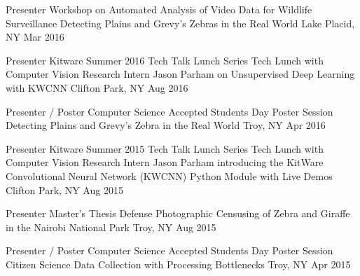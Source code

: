 

\begin{cventries}

  \cventryshort
    {Presenter \dotSep {} Workshop on Automated Analysis of Video Data for Wildlife Surveillance} %
    {Detecting Plains and Grevy's Zebras in the Real World} %
    {Lake Placid, NY} %
    {Mar 2016} %

  \cventryshort
    {Presenter \dotSep Kitware Summer 2016 Tech Talk Lunch Series} %
    {Tech Lunch with Computer Vision Research Intern Jason Parham on Unsupervised Deep Learning with KWCNN} %
    {Clifton Park, NY} %
    {Aug 2016} %

  \cventryshort
    {Presenter / Poster \dotSep Computer Science Accepted Students Day Poster Session} %
    {Detecting Plains and Grevy's Zebra in the Real World} %
    {Troy, NY} %
    {Apr 2016} %

  \cventryshort
    {Presenter \dotSep Kitware Summer 2015 Tech Talk Lunch Series} %
    {Tech Lunch with Computer Vision Research Intern Jason Parham introducing the KitWare Convolutional Neural Network (KWCNN) Python Module with Live Demos} %
    {Clifton Park, NY} %
    {Aug 2015} %

  \cventryshort
    {Presenter \dotSep Master's Thesis Defense} %
    {Photographic Censusing of Zebra and Giraffe in the Nairobi National Park} %
    {Troy, NY} %
    {Aug 2015} %

  \cventryshort
    {Presenter / Poster \dotSep Computer Science Accepted Students Day Poster Session} %
    {Citizen Science Data Collection with Processing Bottlenecks} %
    {Troy, NY} %
    {Apr 2015} %

\end{cventries}
